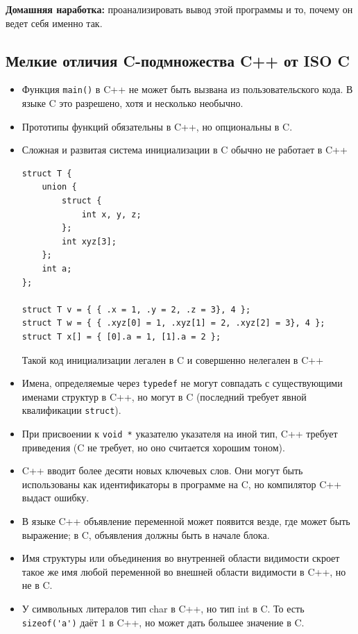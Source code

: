 \documentclass[a4paper,12pt,oneside]{article}
\begin{document}
\textbf{Домашняя наработка:} проанализировать вывод этой программы и то, почему он ведет себя именно так.

\subsection{Мелкие отличия C-подмножества C++ от ISO C}\label{LittleDivergences}

\begin{itemize}
\item
Функция \lstinline!main()! в C++ не может быть вызвана из пользовательского кода. В языке C это разрешено, хотя и несколько необычно.
\item
Прототипы функций обязательны в C++, но опциональны в C.
\item
Сложная и развитая система инициализации в C обычно не работает в C++

\begin{lstlisting}
struct T {
    union {
        struct {
            int x, y, z;
        };
        int xyz[3];
    };
    int a;
};

struct T v = { { .x = 1, .y = 2, .z = 3}, 4 };
struct T w = { { .xyz[0] = 1, .xyz[1] = 2, .xyz[2] = 3}, 4 };
struct T x[] = { [0].a = 1, [1].a = 2 };
\end{lstlisting}

Такой код инициализации легален в C и совершенно нелегален в C++
\item
Имена, определяемые через \lstinline!typedef! не могут совпадать с существующими именами структур в C++, но могут в C (последний требует явной квалификации \lstinline!struct!).
\item
При присвоении к \lstinline!void *! указателю указателя на иной тип, C++ требует приведения (C не требует, но оно считается хорошим тоном).
\item
C++ вводит более десяти новых ключевых слов. Они могут быть использованы как идентификаторы в программе на C, но компилятор C++ выдаст ошибку.
\item
В языке C++ объявление переменной может появится везде, где может быть выражение; в C, объявления должны быть в начале блока.
\item
Имя структуры или объединения во внутренней области видимости скроет такое же имя любой переменной во внешней области видимости в C++, но не в C.
\item
У символьных литералов тип char в C++, но тип int в C. То есть \lstinline!sizeof('a')! даёт 1 в C++, но может дать большее значение в C.
\end{itemize}
\end{document}
